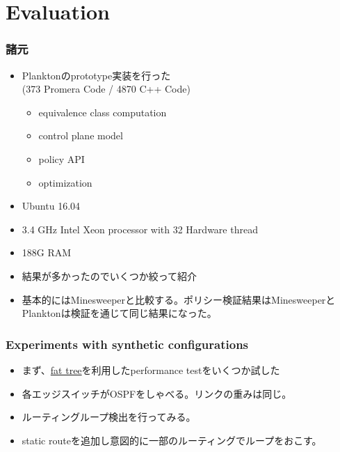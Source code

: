 \documentclass[dvipdfmx,9pt,notheorems]{beamer}
\theoremstyle{definition}
\begin{document}
\section{Evaluation}
\begin{frame}\frametitle{諸元}
\begin{itemize}
	\item Planktonのprototype実装を行った\\
		(373 Promera Code / 4870 C++ Code)
	\begin{itemize}
		\item equivalence class computation
		\item control plane model
		\item policy API
		\item optimization
	\end{itemize}
	\item Ubuntu 16.04
	\item 3.4 GHz Intel Xeon processor with 32 Hardware thread
	\item 188G RAM
	\item 結果が多かったのでいくつか絞って紹介
	\item 基本的にはMinesweeperと比較する。ポリシー検証結果はMinesweeperとPlanktonは検証を通じて同じ結果になった。
\end{itemize}
\pnote{
}
\end{frame}

\begin{frame}\frametitle{Experiments with synthetic configurations}
\begin{itemize}
	\item まず、\href{https://clusterdesign.org/fat-trees/}{fat tree}を利用したperformance testをいくつか試した
	\item 各エッジスイッチがOSPFをしゃべる。リンクの重みは同じ。
	\item ルーティングループ検出を行ってみる。
	\item static routeを追加し意図的に一部のルーティングでループをおこす。
\end{itemize}
\end{frame}
\end{document}
